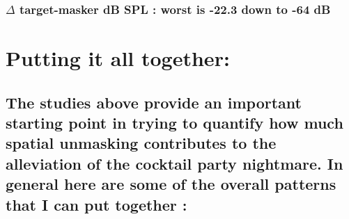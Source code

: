 \documentclass[11pt]{article}
\begin{document}
\hypertarget{delta-target-masker-db-spl-worst-is--22.3-down-to--64-db}{%
\subsubsection{\texorpdfstring{\(\Delta\) target-masker dB SPL : worst
is -22.3 down to -64
dB}{\textbackslash{}Delta target-masker dB SPL : worst is -22.3 down to -64 dB}}\label{delta-target-masker-db-spl-worst-is--22.3-down-to--64-db}}

    \hypertarget{putting-it-all-together}{%
\section{Putting it all together:}\label{putting-it-all-together}}

\hypertarget{the-studies-above-provide-an-important-starting-point-in-trying-to-quantify-how-much-spatial-unmasking-contributes-to-the-alleviation-of-the-cocktail-party-nightmare.-in-general-here-are-some-of-the-overall-patterns-that-i-can-put-together}{%
\subsection{The studies above provide an important starting point in
trying to quantify how much spatial unmasking contributes to the
alleviation of the cocktail party nightmare. In general here are some of
the overall patterns that I can put together
:}\label{the-studies-above-provide-an-important-starting-point-in-trying-to-quantify-how-much-spatial-unmasking-contributes-to-the-alleviation-of-the-cocktail-party-nightmare.-in-general-here-are-some-of-the-overall-patterns-that-i-can-put-together}}
\end{document}
